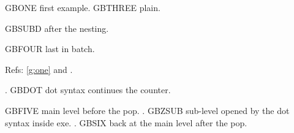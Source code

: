 

\begin{exe}
\ex\label{g:one} GBONE first example.
\ex GBTHREE plain.
 \begin{xlist}
 \ex
  \begin{xlist}
  \end{xlist}
 \ex GBSUBD after the nesting.
 \end{xlist}
\ex GBFOUR last in batch.
\end{exe}

Refs: \ref{g:one} and \Last.

\ex. GBDOT dot syntax continues the counter.

\begin{exe}
\ex GBFIVE main level before the pop.
\a. GBZSUB sub-level opened by the dot syntax inside exe.
\z.
\ex GBSIX back at the main level after the pop.
\end{exe}

